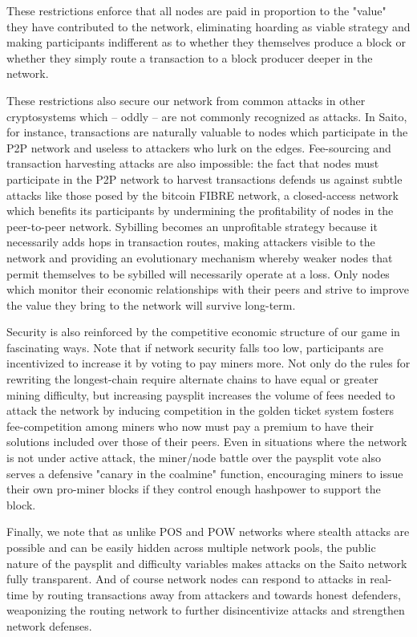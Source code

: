 \documentclass[11.5pt, oneside]{article}   	%
\begin{document}
\begin{multicols}{2}
These restrictions enforce that all nodes are paid in proportion to the "value" they have contributed to the network, eliminating hoarding as viable strategy and making participants indifferent as to whether they themselves produce a block or whether they simply route a transaction to a block producer deeper in the network.

These restrictions also secure our network from common attacks in other cryptosystems which -- oddly -- are not commonly recognized as attacks. In Saito, for instance, transactions are naturally valuable to nodes which participate in the P2P network and useless to attackers who lurk on the edges. Fee-sourcing and transaction harvesting attacks are also impossible: the fact that nodes must participate in the P2P network to harvest transactions defends us against subtle attacks like those posed by the bitcoin FIBRE network, a closed-access network which benefits its participants by undermining the profitability of nodes in the peer-to-peer network. Sybilling becomes an unprofitable strategy because it necessarily adds hops in transaction routes, making attackers visible to the network and providing an evolutionary mechanism whereby weaker nodes that permit themselves to be sybilled will necessarily operate at a loss. Only nodes which monitor their economic relationships with their peers and strive to improve the value they bring to the network will survive long-term.

Security is also reinforced by the competitive economic structure of our game in fascinating ways. Note that if network security falls too low, participants are incentivized to increase it by voting to pay miners more. Not only do the rules for rewriting the longest-chain require alternate chains to have equal or greater mining difficulty, but increasing paysplit increases the volume of fees needed to attack the network by inducing competition in the golden ticket system fosters fee-competition among miners who now must pay a premium to have their solutions included over those of their peers. Even in situations where the network is not under active attack, the miner/node battle over the paysplit vote also serves a defensive "canary in the coalmine" function, encouraging miners to issue their own pro-miner blocks if they control enough hashpower to support the block.

Finally, we note that as unlike POS and POW networks where stealth attacks are possible and can be easily hidden across multiple network pools, the public nature of the paysplit and difficulty variables makes attacks on the Saito network fully transparent. And of course network nodes can respond to attacks in real-time by routing transactions away from attackers and towards honest defenders, weaponizing the routing network to further disincentivize attacks and strengthen network defenses.


\end{multicols}
\end{document}
